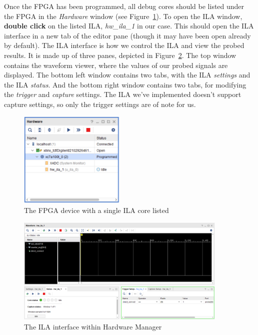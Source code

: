\documentclass[11pt]{article}
\begin{document}
Once the FPGA has been programmed, all debug cores should be listed under the FPGA in the \textit{Hardware} window (see Figure~\ref{fig:hw_ila}). To open the ILA window, \textbf{double click} on the listed ILA, \textit{hw\_ila\_1} in our case. This should open the ILA interface in a new tab of the editor pane (though it may have been open already by default). The ILA interface is how we control the ILA and view the probed results. It is made up of three panes, depicted in Figure~\ref{fig:ila_interface}. The top window contains the waveform viewer, where the values of our probed signals are displayed. The bottom left window contains two tabs, with the ILA \textit{settings} and the ILA \textit{status}. And the bottom right window contains two tabs, for modifying the \textit{trigger} and \textit{capture} settings. The ILA we've implemented doesn't support capture settings, so only the trigger settings are of note for us.

\begin{figure}[!h]
    \centering
    \includegraphics[width=0.45\textwidth]{images/hw_ila.png}
    \caption{The FPGA device with a single ILA core listed}
    \label{fig:hw_ila}
\end{figure}

\begin{figure}[!h]
    \centering
    \includegraphics[width=0.9\textwidth]{images/ila_interface.png}
    \caption{The ILA interface within Hardware Manager}
    \label{fig:ila_interface}
\end{figure}
\end{document}
